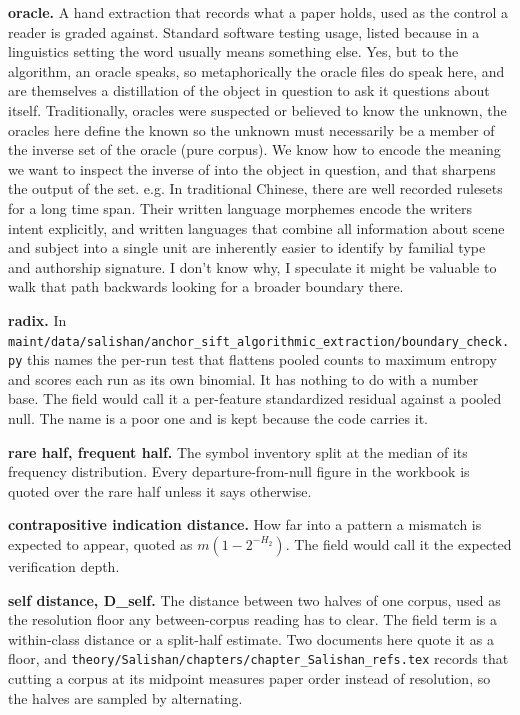\noindent\textbf{oracle.} A hand extraction that records what a paper holds, used as the control a reader is graded against. Standard software testing usage, listed because in a linguistics setting the word usually means something else. Yes, but to the algorithm, an oracle speaks, so metaphorically the oracle files do speak here, and are themselves a distillation of the object in question to ask it questions about itself. Traditionally, oracles were suspected or believed to know the unknown, the oracles here define the known so the unknown must necessarily be a member of the inverse set of the oracle (pure corpus). We know how to encode the meaning we want to inspect the inverse of into the object in question, and that sharpens the output of the set. e.g. In traditional Chinese, there are well recorded rulesets for a long time span. Their written language morphemes encode the writers intent explicitly, and written languages that combine all information about scene and subject into a single unit are inherently easier to identify by familial type and authorship signature. I don't know why, I speculate it might be valuable to walk that path backwards looking for a broader boundary there.

\noindent\textbf{radix.} In \texttt{maint/\allowbreak{}data/\allowbreak{}salishan/\allowbreak{}anchor\_\allowbreak{}sift\_\allowbreak{}algorithmic\_\allowbreak{}extraction/\allowbreak{}boundary\_\allowbreak{}check.\allowbreak{}py} this names the per-run test that flattens pooled counts to maximum entropy and scores each run as its own binomial. It has nothing to do with a number base. The field would call it a per-feature standardized residual against a pooled null. The name is a poor one and is kept because the code carries it.

\noindent\textbf{rare half, frequent half.} The symbol inventory split at the median of its frequency distribution. Every departure-from-null figure in the workbook is quoted over the rare half unless it says otherwise.

\noindent\textbf{contrapositive indication distance.} How far into a pattern a mismatch is expected to appear, quoted as \(m(1-2^{-H_2})\). The field would call it the expected verification depth.

\noindent\textbf{self distance, D\_self.} The distance between two halves of one corpus, used as the resolution floor any between-corpus reading has to clear. The field term is a within-class distance or a split-half estimate. Two documents here quote it as a floor, and \texttt{theory/\allowbreak{}Salishan/\allowbreak{}chapters/\allowbreak{}chapter\_\allowbreak{}Salishan\_\allowbreak{}refs.\allowbreak{}tex} records that cutting a corpus at its midpoint measures paper order instead of resolution, so the halves are sampled by alternating.


